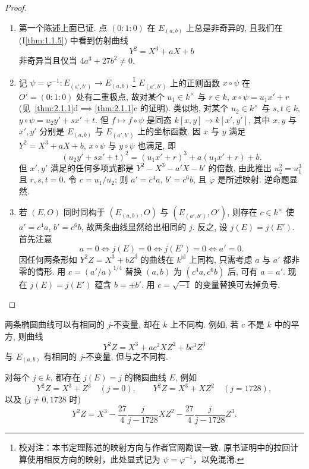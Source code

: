 \begin{proof}\begin{enumerate}[label=\textup{(\alph*)}]

\item 第一个陈述上面已证. 点 $(0:1:0)$ 在 $E_{(a,b)}$ 上总是非奇异的, 且我们在 (I\ref{thm:1.1.5}) 中看到仿射曲线
\[
Y^2 = X^3 + aX + b
\]
非奇异当且仅当 $4a^3 + 27b^2\neq 0$.

\item 记 $\psi = \varphi^{-1}\colon E_{(a',b')}\to E_{(a,b)}$.\footnote{校对注：本书定理陈述的映射方向与作者官网勘误一致. 原书证明中的拉回计算使用相反方向的映射，此处显式记为 $\psi=\varphi^{-1}$，以免混淆.} $E_{(a',b')}$ 上的正则函数 $x\circ\psi$ 在 $O' = (0:1:0)$ 处有二重极点, 故对某个 $u_1\in k^{\times}$ 与 $r\in k$, $x\circ\psi = u_1x' + r$ (见~\ref{thm:2.1.1}d$\implies$\ref{thm:2.1.1}c 的证明). 类似地, 对某个 $u_2\in k^{\times}$ 与 $s,t\in k$, $y\circ\psi = u_2y' + sx' + t$. 但 $f\mapsto f\circ\psi$ 是同态 $k[x,y]\to k[x',y']$, 其中 $x,y$ 与 $x',y'$ 分别是 $E_{(a,b)}$ 与 $E_{(a',b')}$ 上的坐标函数. 因 $x$ 与 $y$ 满足 $Y^2 = X^3 + aX + b$, $x\circ\psi$ 与 $y\circ\psi$ 也满足, 即
\[
(u_2y' + sx' + t)^2 = (u_1x' + r)^3 + a(u_1x' + r) + b.
\]
但 $x',y'$ 满足的任何多项式都是 $Y^2 - X^3 - a'X - b'$ 的倍数, 由此推出 $u_2^2 = u_1^3$ 且 $r,s,t = 0$. 令 $c = u_1/u_2$; 则 $a' = c^4a$, $b' = c^6b$, 且 $\varphi$ 是所述映射. 逆命题显然.

\item 若 $(E,O)$ 同时同构于 $(E_{(a,b)}, O)$ 与 $(E_{(a',b')}, O')$, 则存在 $c\in k^{\times}$ 使 $a' = c^4a$, $b' = c^6b$, 故两条曲线显然给出相同的 $j$. 反之, 设 $j(E) = j(E')$. 首先注意
\[
a = 0 \iff j(E) = 0 \iff j(E') = 0 \iff a' = 0.
\]
因任何两条形如 $Y^2Z = X^3 + bZ^3$ 的曲线在 $k^{\mathrm{al}}$ 上同构, 只需考虑 $a$ 与 $a'$ 都非零的情形. 用 $c = (a'/a)^{1/4}$ 替换 $(a,b)$ 为 $(c^4a, c^6b)$ 后, 可有 $a = a'$. 现在 $j(E) = j(E')$ 蕴含 $b = \pm b'$. 用 $c = \sqrt{-1}$ 的变量替换可去掉负号.


\end{enumerate}\end{proof}

\begin{remark} \label{thm:2.2.2} 
两条椭圆曲线可以有相同的 $j$-不变量, 却在 $k$ 上不同构. 例如, 若 $c$ 不是 $k$ 中的平方, 则曲线
\[
Y^2Z = X^3 + ac^2XZ^2 + bc^3Z^3
\]
与 $E_{(a,b)}$ 有相同的 $j$-不变量, 但与之不同构.
\end{remark}

\begin{remark} \label{thm:2.2.3} 
对每个 $j\in k$, 都存在 $j(E) = j$ 的椭圆曲线 $E$, 例如
\[
Y^2Z = X^3 + Z^3 \quad (j = 0), \qquad
Y^2Z = X^3 + XZ^2 \quad (j = 1728),
\]
以及 ($j\neq 0, 1728$ 时)
\[
Y^2Z = X^3 - \frac{27}{4}\frac{j}{j-1728}XZ^2 - \frac{27}{4}\frac{j}{j-1728}Z^3.
\]
\end{remark}

